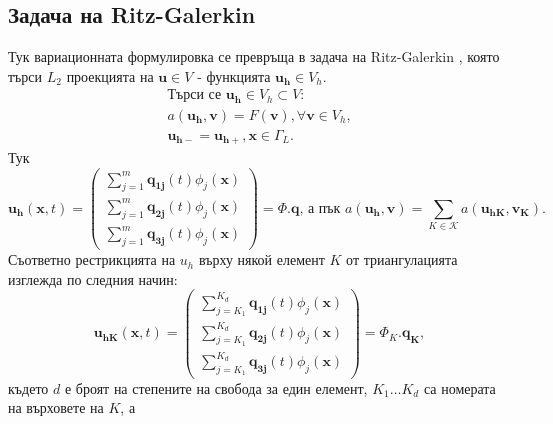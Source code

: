 \documentclass{report}
\begin{document}
	\subsection{Задача на Ritz-Galerkin}
	Тук вариационната формулировка се превръща в задача на Ritz-Galerkin \cite{larson2013finite}, която търси $L_2$ проекцията на $\mathbf{u} \in V$ - функцията $\mathbf{u_h} \in V_h$.
	\begin{align*}
		\text{Търси се } \mathbf{u_h} \in V_h \subset V:\\
		a(\mathbf{u_h}, \mathbf{v})=F(\mathbf{v}), \forall \mathbf{v} \in V_h,\\
		\mathbf{u_{h-}}=\boldsymbol{u_{h+}},\mathbf{x} \in \Gamma_L.
	\end{align*}
	Тук 
	\[
	\mathbf{u_h}(\mathbf{x},t)=
	\begin{pmatrix}
		\displaystyle \sum_{j=1}^m\mathbf{q_{1j}}(t)\phi_j(\mathbf{x})\\
		\displaystyle \sum_{j=1}^m\mathbf{q_{2j}}(t)\phi_j(\mathbf{x})\\
		\displaystyle \sum_{j=1}^m\mathbf{q_{3j}}(t)\phi_j(\mathbf{x})
	\end{pmatrix}
	=
	\Phi.\mathbf{q} \text{, а пък }
	a(\mathbf{u_h}, \mathbf{v})=\sum_{K \in \mathcal{K}}a(\mathbf{u_{hK}}, \mathbf{v_K}).
	\]
	Съответно рестрикцията на $u_h$ върху някой елемент $K$ от триангулацията изглежда по следния начин:
	\[
	\mathbf{u_{hK}}(\mathbf{x},t)=
	\begin{pmatrix}
		\displaystyle \sum_{j=K_1}^{K_d}\mathbf{q_{1j}}(t)\phi_j(\mathbf{x})\\
		\displaystyle \sum_{j=K_1}^{K_d}\mathbf{q_{2j}}(t)\phi_j(\mathbf{x})\\
		\displaystyle \sum_{j=K_1}^{K_d}\mathbf{q_{3j}}(t)\phi_j(\mathbf{x})
	\end{pmatrix}
	=
	\Phi_K.\mathbf{q_K},
	\]
	където $d$ е броят на степените на свобода за един елемент, $K_1 \dots K_d$ са номерата на върховете на $K$, а
\end{document}
